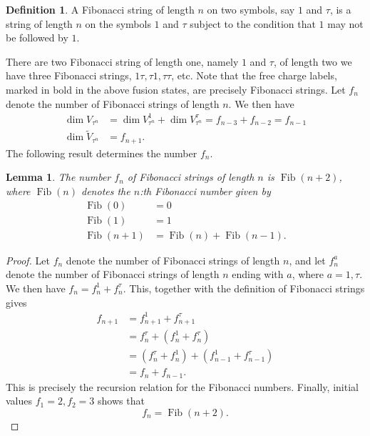 \documentclass[a4paper,10pt,oneside]{book}
\theoremstyle{plain}
\newtheorem{lemma}[theorem]{Lemma}
\theoremstyle{definition}
\newtheorem{definition}{Definition}[section]
\theoremstyle{remark}
\DeclareMathOperator{\Fib}{Fib}
\begin{document}
\begin{definition}\label{def:fibonacci strings}
  A Fibonacci string of length $n$ on two symbols, say $1$ and $τ$, is a string of length $n$ on the symbols $1$ and $τ$ subject to the condition that $1$ may not be followed by $1$.
\end{definition}

There are two Fibonacci string of length one, namely $1$ and $τ$, of length two we have three Fibonacci strings, $1τ, τ1, ττ$, etc. Note that the free charge labels, marked in bold in the above fusion states, are precisely Fibonacci strings. Let $f_n$ denote the number of Fibonacci strings of length $n$. We then have
\begin{equation}
  \begin{aligned}
    \dim V_{τ^n} &= \dim V_{τ^n}^1 + \dim V_{τ^n}^τ = f_{n-3} + f_{n-2} = f_{n-1} \\
    \dim \widetilde{V}_{τ^n} &= f_{n+1}.
  \end{aligned}
\end{equation}
The following result determines the number $f_n$.

\begin{lemma}\label{lemma:fibonacci string length}
  The number $f_n$ of Fibonacci strings of length $n$ is $\Fib(n + 2)$, where $\Fib(n)$ denotes the $n$:th Fibonacci number given by
  \begin{equation}
    \begin{aligned}
      \Fib(0) &= 0 \\
      \Fib(1) &= 1 \\
      \Fib(n+1) &= \Fib(n) + \Fib(n-1).
    \end{aligned}
  \end{equation}
\end{lemma}

\begin{proof}
  Let $f_n$ denote the number of Fibonacci strings of length $n$, and let $f^a_n$ denote the number of Fibonacci strings of length $n$ ending with $a$, where $a = 1, τ$. We then have $f_n = f^1_n + f^τ_n$. This, together with the definition of Fibonacci strings gives
  \begin{equation}
    \begin{aligned}
      f_{n+1}
      &= f^1_{n+1} + f^τ_{n+1} \\
      &= f^τ_n + \left(f^1_n + f^τ_n\right) \\
      &= \left(f^τ_n + f^1_n\right) + \left(f^1_{n-1} + f^τ_{n-1}\right) \\
      &= f_n + f_{n-1}.
    \end{aligned}
  \end{equation}
  This is precisely the recursion relation for the Fibonacci numbers. Finally, initial values $f_1 = 2, f_2 = 3$ shows that
  \begin{equation}
    f_n = \Fib(n+2).
  \end{equation}
\end{proof}
\end{document}
